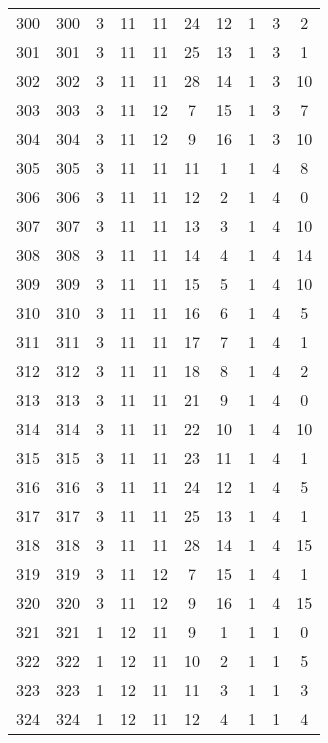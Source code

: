 \begin{longtable}{cccccccccc}
  300 & 300 &   3 &  11 &  11 &  24 &  12 &   1 &   3 &   2 \\ 
  301 & 301 &   3 &  11 &  11 &  25 &  13 &   1 &   3 &   1 \\ 
  302 & 302 &   3 &  11 &  11 &  28 &  14 &   1 &   3 &  10 \\ 
  303 & 303 &   3 &  11 &  12 &   7 &  15 &   1 &   3 &   7 \\ 
  304 & 304 &   3 &  11 &  12 &   9 &  16 &   1 &   3 &  10 \\ 
  305 & 305 &   3 &  11 &  11 &  11 &   1 &   1 &   4 &   8 \\ 
  306 & 306 &   3 &  11 &  11 &  12 &   2 &   1 &   4 &   0 \\ 
  307 & 307 &   3 &  11 &  11 &  13 &   3 &   1 &   4 &  10 \\ 
  308 & 308 &   3 &  11 &  11 &  14 &   4 &   1 &   4 &  14 \\ 
  309 & 309 &   3 &  11 &  11 &  15 &   5 &   1 &   4 &  10 \\ 
  310 & 310 &   3 &  11 &  11 &  16 &   6 &   1 &   4 &   5 \\ 
  311 & 311 &   3 &  11 &  11 &  17 &   7 &   1 &   4 &   1 \\ 
  312 & 312 &   3 &  11 &  11 &  18 &   8 &   1 &   4 &   2 \\ 
  313 & 313 &   3 &  11 &  11 &  21 &   9 &   1 &   4 &   0 \\ 
  314 & 314 &   3 &  11 &  11 &  22 &  10 &   1 &   4 &  10 \\ 
  315 & 315 &   3 &  11 &  11 &  23 &  11 &   1 &   4 &   1 \\ 
  316 & 316 &   3 &  11 &  11 &  24 &  12 &   1 &   4 &   5 \\ 
  317 & 317 &   3 &  11 &  11 &  25 &  13 &   1 &   4 &   1 \\ 
  318 & 318 &   3 &  11 &  11 &  28 &  14 &   1 &   4 &  15 \\ 
  319 & 319 &   3 &  11 &  12 &   7 &  15 &   1 &   4 &   1 \\ 
  320 & 320 &   3 &  11 &  12 &   9 &  16 &   1 &   4 &  15 \\ 
  321 & 321 &   1 &  12 &  11 &   9 &   1 &   1 &   1 &   0 \\ 
  322 & 322 &   1 &  12 &  11 &  10 &   2 &   1 &   1 &   5 \\ 
  323 & 323 &   1 &  12 &  11 &  11 &   3 &   1 &   1 &   3 \\ 
  324 & 324 &   1 &  12 &  11 &  12 &   4 &   1 &   1 &   4 \\ 

\end{longtable}
